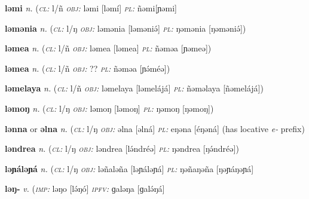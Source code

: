 \newentry
\headword\textbf{ləmi} 
\ipa{[ləmí]}
\synpos\textit{n.} 
\class(\textit{\textsc{cl:}} {l/ñ}
\object\textit{\textsc{obj:}} ləmi [ləmí]
\plural\textit{\textsc{pl:}} ñəmi[ɲəmi]



\newentry
\headword\textbf{ləmənia} 
\ipa{[ləməniə́]}
\synpos\textit{n.} 
\class(\textit{\textsc{cl:}} {l/ŋ}
\object\textit{\textsc{obj:}} ləmənia [ləməniə́]
\plural\textit{\textsc{pl:}} ŋəmənia [ŋəməniə́])

\newentry
\headword\textbf{ləmea} 
\ipa{[ləmeə]}
\synpos\textit{n.} 
\class(\textit{\textsc{cl:}} {l/ñ}
\object\textit{\textsc{obj:}} ləmea [ləmea]
\plural\textit{\textsc{pl:}} ñəməa [ɲəmeə])

\newentry
\headword\textbf{ləmea} 
\ipa{[lə́méə]}
\synpos\textit{n.} 
\class(\textit{\textsc{cl:}} {l/ñ}
\object\textit{\textsc{obj:}} ??
\plural\textit{\textsc{pl:}} ñəməa [ɲə́méə])

\newentry
\headword\textbf{ləmelaya} 
\ipa{[ləmelájá]}
\synpos\textit{n.} 
\class(\textit{\textsc{cl:}} {l/ñ}
\object\textit{\textsc{obj:}} ləmelaya [ləmelájá]
\plural\textit{\textsc{pl:}} ñəməlaya [ñəmelájá])

\newentry
\headword\textbf{ləmoŋ} 
\ipa{[ləmoŋ]}
\synpos\textit{n.} 
\class(\textit{\textsc{cl:}} {l/ŋ}
\object\textit{\textsc{obj:}} ləmoŋ [ləmoŋ]
\plural\textit{\textsc{pl:}} ŋəmoŋ [ŋəmoŋ])

\newentry
\headword\textbf{lənna} or \textbf{əlna}
\synpos\textit{n.} 
\class(\textit{\textsc{cl:}} {l/ŋ}
\object\textit{\textsc{obj:}} əlna [əlná]
\plural\textit{\textsc{pl:}} eŋəna [éŋəná] (has locative \textit{e-} prefix)

\newentry
\headword\textbf{ləndrea} 
\ipa{[lə́ndréə]}
\synpos\textit{n.} 
\class(\textit{\textsc{cl:}} {l/ŋ}
\object\textit{\textsc{obj:}} ləndrea [lə́ndréə]
\plural\textit{\textsc{pl:}} ŋəndrea [ŋə́ndréə])

\newentry
\headword\textbf{ləɲáləɲá} 
\ipa{[ləɲáləɲá}
\synpos\textit{n.} 
\class(\textit{\textsc{cl:}} {l/ŋ}
\object\textit{\textsc{obj:}} ləñaləña [ləɲáləɲá]
\plural\textit{\textsc{pl:}} ŋəñaŋəña [ŋəɲáŋəɲá] 

\newentry
\headword\textbf{ləŋ-}  
\ipa{[lə́ŋ-]}
\synpos\textit{v.} 
\imperative(\textit {\textsc{imp:}} ləŋo [lə́ŋó]  
\imperfective\textit{\textsc{ipfv:}} ɡaləŋa [ɡalə́ŋá]

